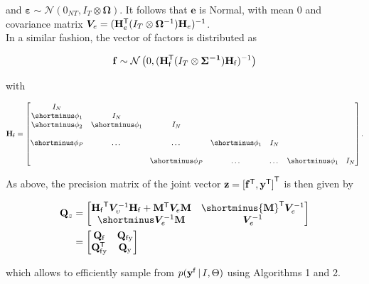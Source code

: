 \documentclass[notitlepage,a4paper,12pt]{article}
\newcommand{\transpose}[1]{{#1}^{\sf{T}}}
\begin{document}
\noindent and $\boldsymbol{\varepsilon} \sim \mathcal{N}(0_{NT}, I_T \otimes \boldsymbol{\Omega})$. It follows that $\mathbf{e}$ is Normal, with mean $0$ and covariance matrix $\bm{V}_{e} = (\transpose{\mathbf{H}}_{e} (I_T \otimes \boldsymbol{\Omega}^{-1}) \mathbf{H}_e)^{-1}$. \\

In a similar fashion, the vector of factors is distributed as 

$$
\mathbf{f} \sim \mathcal{N}\left(0, (\transpose{\mathbf{H}}_{\sf{f}} (I_T \otimes \boldsymbol{\Sigma^{-1}}) \mathbf{H}_{\sf{f}})^{-1}\right)
$$

with 

$$
\mathbf{H}_{\sf{f}}
=
\begin{bmatrix}
    I_N &  \\
    \shortminus \phi_1 & I_N &  \\
    \shortminus \phi_2 & \shortminus \phi_1 & I_N &  \\
     &  &  &  &  & \\
    \shortminus \phi_P & \dots & \dots & \shortminus \phi_1 & I_N \\
     &  &  &  &  & \\
    & & \shortminus \phi_P & \dots & \dots & \shortminus \phi_1 & I_N
\end{bmatrix}.
$$

As above, the precision matrix of the joint vector $\mathbf{z} = \transpose{[\transpose{\mathbf{f}}, \transpose{\mathbf{y}}]}$ is then given by 

\begin{align*}
    \mathbf{Q}_z 
    &= 
    \begin{bmatrix}
         \transpose{\mathbf{H}_{\sf{f}}} \bm{V}^{-1}_{\upsilon} \mathbf{H}_{\sf{f}} + \transpose{\mathbf{M}}\bm{V}_{e}\mathbf{M}  & \shortminus \transpose{\mathbf{M}} \bm{V}^{-1}_{e} \\
         \shortminus \bm{V}^{-1}_{e} \mathbf{M} & \bm{V}^{-1}_{e}
    \end{bmatrix} \\
    &= 
    \begin{bmatrix}
        \mathbf{Q}_{\sf{f}} & \mathbf{Q}_{\sf{f}\text{y}} \\
        \transpose{\mathbf{Q}}_{\sf{f} \text{y}} & \mathbf{Q}_{\text{y}}  
    \end{bmatrix}
\end{align*}

which allows to efficiently sample from $p(\mathbf{y}^{\sf{f}}\,|\, I, \Theta)$ using Algorithms 1 and 2. 
\end{document}
